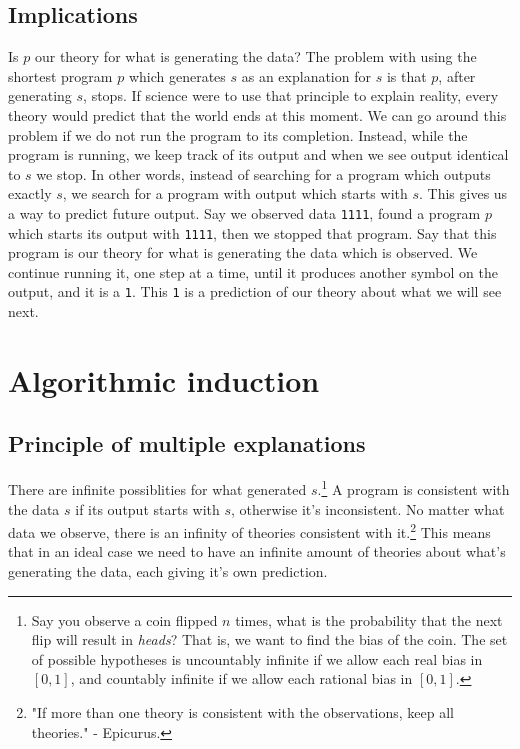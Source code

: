 \newpage

\subsection{Implications}

Is $p$ our theory for what is generating the data?
The problem with using the shortest program $p$ which generates $s$ as an explanation for $s$ is that $p$, after generating $s$, stops.
If science were to use that principle to explain reality, every theory would predict that the world ends at this moment.
We can go around this problem if we do not run the program to its completion.
Instead, while the program is running, we keep track of its output and when we see output identical to $s$ we stop.
In other words, instead of searching for a program which outputs exactly $s$, we search for a program with output which starts with $s$.
This gives us a way to predict future output.
Say we observed data \texttt{1111}, found a program $p$ which starts its output with \texttt{1111}, then we stopped that program.
Say that this program is our theory for what is generating the data which is observed.
We continue running it, one step at a time, until it produces another symbol on the output, and it is a \texttt{1}.
This \texttt{1} is a prediction of our theory about what we will see next.

\newpage

\section{Algorithmic induction}

\subsection{Principle of multiple explanations}

There are infinite possiblities for what generated $s$.\footnote{Say you observe a coin flipped $n$ times, what is the probability that the next flip will result in \textit{heads}? That is, we want to find the bias of the coin. The set of possible hypotheses is uncountably infinite if we allow each real bias in $[0, 1]$, and countably infinite if we allow each rational bias in $[0, 1]$.}
A program is consistent with the data $s$ if its output starts with $s$, otherwise it's inconsistent.
No matter what data we observe, there is an infinity of theories consistent with it.\footnote{"If more than one theory is consistent with the observations, keep all theories." - Epicurus.}
This means that in an ideal case we need to have an infinite amount of theories about what's generating the data, each giving it's own prediction.

